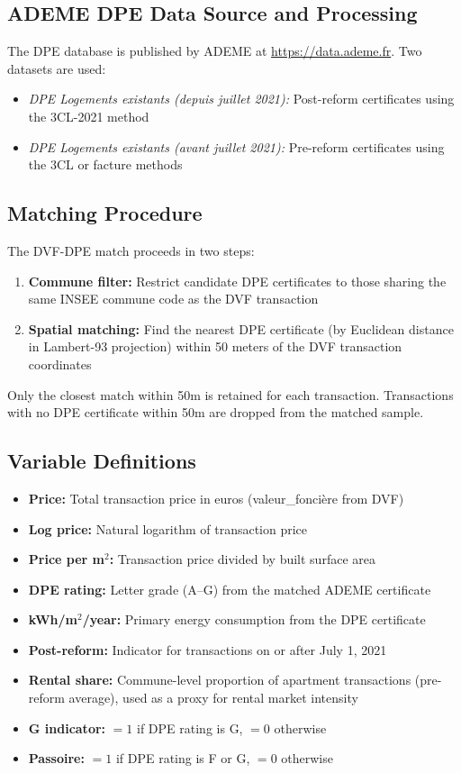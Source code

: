 \documentclass[12pt]{article}
\begin{document}
\subsection{ADEME DPE Data Source and Processing}

The DPE database is published by ADEME at \url{https://data.ademe.fr}. Two datasets are used:
\begin{itemize}
    \item \textit{DPE Logements existants (depuis juillet 2021):} Post-reform certificates using the 3CL-2021 method
    \item \textit{DPE Logements existants (avant juillet 2021):} Pre-reform certificates using the 3CL or facture methods
\end{itemize}

\subsection{Matching Procedure}

The DVF-DPE match proceeds in two steps:
\begin{enumerate}
    \item \textbf{Commune filter:} Restrict candidate DPE certificates to those sharing the same INSEE commune code as the DVF transaction
    \item \textbf{Spatial matching:} Find the nearest DPE certificate (by Euclidean distance in Lambert-93 projection) within 50 meters of the DVF transaction coordinates
\end{enumerate}

Only the closest match within 50m is retained for each transaction. Transactions with no DPE certificate within 50m are dropped from the matched sample.

\subsection{Variable Definitions}

\begin{itemize}
    \item \textbf{Price:} Total transaction price in euros (valeur\_fonci\`ere from DVF)
    \item \textbf{Log price:} Natural logarithm of transaction price
    \item \textbf{Price per m$^2$:} Transaction price divided by built surface area
    \item \textbf{DPE rating:} Letter grade (A--G) from the matched ADEME certificate
    \item \textbf{kWh/m$^2$/year:} Primary energy consumption from the DPE certificate
    \item \textbf{Post-reform:} Indicator for transactions on or after July 1, 2021
    \item \textbf{Rental share:} Commune-level proportion of apartment transactions (pre-reform average), used as a proxy for rental market intensity
    \item \textbf{G indicator:} $= 1$ if DPE rating is G, $= 0$ otherwise
    \item \textbf{Passoire:} $= 1$ if DPE rating is F or G, $= 0$ otherwise
\end{itemize}
\end{document}

